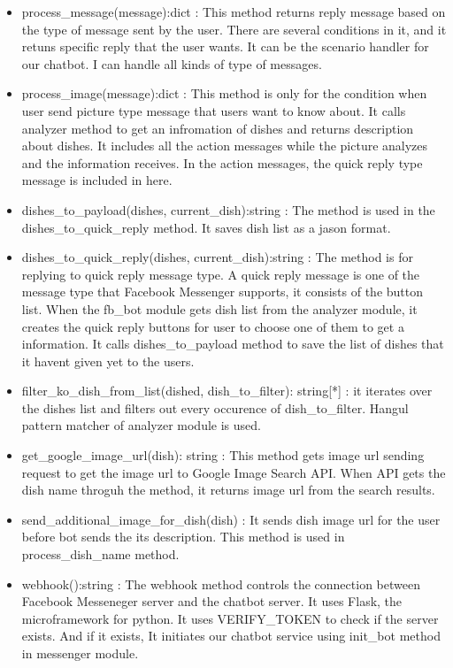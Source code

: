 \begin{itemize}
\item process\_message(message):dict : This method returns reply message based on the type of message sent by the user. There are several conditions in it, and it retuns specific reply that the user wants. It can be the scenario handler for our chatbot. I can handle all kinds of type of messages. \newline
\item process\_image(message):dict : This method is only for the condition when user send picture type message that users want to know about. It calls analyzer method to get an infromation of dishes and returns description about dishes. It includes all the action messages while the picture analyzes and the information receives. In the action messages, the quick reply type message is included in here. \newline
\item dishes\_to\_payload(dishes, current\_dish):string : The method is used in the dishes\_to\_quick\_reply method. It saves dish list as a jason format. \newline
\item dishes\_to\_quick\_reply(dishes, current\_dish):string : The method is for replying to quick reply message type. A quick reply message is one of the message type that Facebook Messenger supports, it consists of the button list. When the fb\_bot module gets dish list from the analyzer module, it creates the quick reply buttons for user to choose one of them to get a information. It calls dishes\_to\_payload method to save the list of dishes that it havent given yet to the users. \newline
\item filter\_ko\_dish\_from\_list(dished, dish\_to\_filter): string[*] : it iterates over the dishes list and filters out every occurence of dish\_to\_filter. Hangul pattern matcher of analyzer module is used. \newline 
\item get\_google\_image\_url(dish): string : This method gets image url sending request to get the image url to Google Image Search API. When API gets the dish name throguh the method, it returns image url from the search results.\newline
\item send\_additional\_image\_for\_dish(dish) : It sends dish image url for the user before bot sends the its description. This method is used in process\_dish\_name method. \newline 
\item webhook():string : The webhook method controls the connection between Facebook Messeneger server and the chatbot server. It uses Flask, the microframework for python. It uses VERIFY\_TOKEN to check if the server exists. And if it exists, It initiates our chatbot service using init\_bot method in messenger module.
\end{itemize} 

